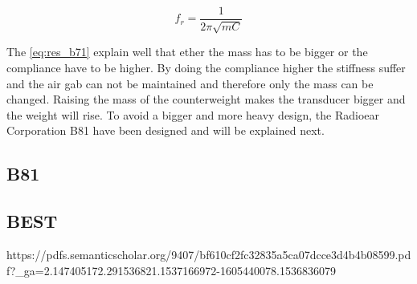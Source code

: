 \begin{equation}\label{eq:res_b71}
f_r=\frac{1}{2 \pi \sqrt{m C}}
\end{equation}

    \startexplain
    \stopexplain

The \autoref{eq:res_b71} explain well that ether the mass has to be bigger or the compliance have to be higher. By doing the compliance higher the stiffness suffer and the air gab can not be maintained and therefore only the mass can be changed. Raising the mass of the counterweight makes the transducer bigger and the weight will rise. To avoid a bigger and more heavy design, the Radioear Corporation B81 have been designed and will be explained next. 


\subsection{B81}

\subsection{BEST}

https://pdfs.semanticscholar.org/9407/bf610cf2fc32835a5ca07dcce3d4b4b08599.pdf?_ga=2.147405172.291536821.1537166972-1605440078.1536836079